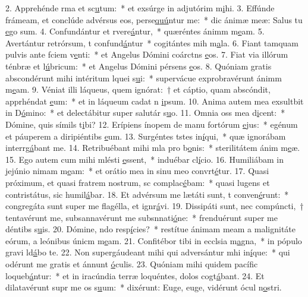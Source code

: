 2. Apprehénde rma et sc\uline{u}tum:~* et exsúrge in adjutórim m\uline{i}hi.
3. Effúnde frámeam, et conclúde advérsus eos,  perse\uline{quú}ntur me:~* dic ánimæ meæ: Salus tu \uline{e}go sum.
4. Confundántur et rvere\uline{á}ntur,~* quæréntes ánimm m\uline{e}am.
5. Avertántur retrórsum, t confund\uline{á}ntur~* cogitántes mih m\uline{a}la.
6. Fiant tamquam pulvis ante fciem v\uline{e}nti:~* et Angelus Dómini coárctns \uline{e}os.
7. Fiat via illórum ténbræ et l\uline{ú}bricum:~* et Angelus Dómini pérsens \uline{e}os.
8. Quóniam gratis abscondérunt mihi intéritum lquei s\uline{u}i:~* supervácue exprobravérunt ánimm m\uline{e}am.
9. Véniat illi láqueus, quem ignórat:~† et cáptio, quam abscóndit, apprhéndat \uline{e}um:~* et in láqueum cadat n \uline{i}psum.
10. Anima autem mea exsultbit in D\uline{ó}mino:~* et delectábitur super salutár s\uline{u}o.
11. Omnia oss mea d\uline{i}cent:~* Dómine, quis símils t\uline{i}bi?
12. Erípiens ínopem de manu fortórum \uline{e}jus:~* egénum et páuperem a diripiéntibs \uline{e}um.
13. Surgéntes tstes in\uline{í}qui,~* quæ ignorábam interrg\uline{á}bant me.
14. Retribuébant mihi mla pro b\uline{o}nis:~* sterilitátem ánim m\uline{e}æ.
15. Ego autem cum mihi mlésti \uline{e}ssent,~* induébar cl\uline{í}cio.
16. Humiliábam in jejúnio nimam m\uline{e}am:~* et orátio mea in sinu meo convrt\uline{é}tur.
17. Quasi próximum, et quasi fratrem nostrum, sc complac\uline{é}bam:~* quasi lugens et contristátus, sic humil\uline{á}bar.
18. Et advérsum me lætáti sunt, t conven\uline{é}runt:~* congregáta sunt super me flagélla, et ignr\uline{á}vi.
19. Dissipáti sunt, nec compúncti,~† tentavérunt me, subsannavérunt me subsnnati\uline{ó}ne:~* frenduérunt super me déntibs s\uline{u}is.
20. Dómine, ndo resp\uline{í}cies?~* restítue ánimam meam a malignitáte eórum, a leónibus únicm m\uline{e}am.
21. Confitébor tibi in ecclsia m\uline{a}gna,~* in pópulo gravi ld\uline{á}bo te.
22. Non supergáudeant mihi qui adversántur mhi in\uline{í}que:~* qui odérunt me gratis et ánnunt \uline{ó}culis.
23. Quóniam mihi quidem pacífic loqueb\uline{á}ntur:~* et in iracúndia terræ loquéntes, dolos cogt\uline{á}bant.
24. Et dilatavérunt supr me os s\uline{u}um:~* dixérunt: Euge, euge, vidérunt ócul n\uline{o}stri.
